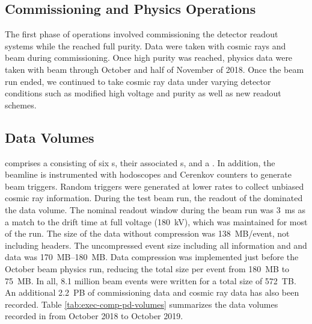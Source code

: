 \subsection{Commissioning and Physics Operations}

The first phase of operations involved commissioning the detector readout systems while the  reached full purity.  Data were taken with cosmic rays and beam during commissioning. Once high  purity was reached, physics data were  taken with beam through October and half of November of 2018. %
Once the beam run ended, we continued to take cosmic ray data under varying detector conditions such as modified high voltage and purity as well as new readout schemes. 

\subsection{Data Volumes}
 comprises a  consisting of  six s, their associated s, and a . %
In addition, the  beamline is instrumented with hodoscopes and Cerenkov counters to generate beam triggers. Random triggers  were generated at lower rates to collect unbiased cosmic ray information. During the test beam run, the readout of the  dominated the data volume. %
The nominal readout window during the beam run was \SI{3}{ms} as a match to the drift time at full voltage (\SI{180}{kV}), which was maintained for most of the run.  The size of the  data without compression was  \SI{138}{MB/event}, not including headers.  The uncompressed event size including all  information and  and  data was \SIrange{170}{180}{MB}. Data compression was implemented just before the October beam physics run, reducing the total size per event from  \SI{180}{MB} to \SI{75}{MB}.  In all, 8.1 million beam events were written for a total size of \SI{572}{TB}.  An additional \SI{2.2}{PB} of commissioning data and cosmic ray data has also been recorded. Table \ref{tab:exec-comp-pd-volumes} summarizes the data volumes recorded in  from October 2018 to October 2019. 


